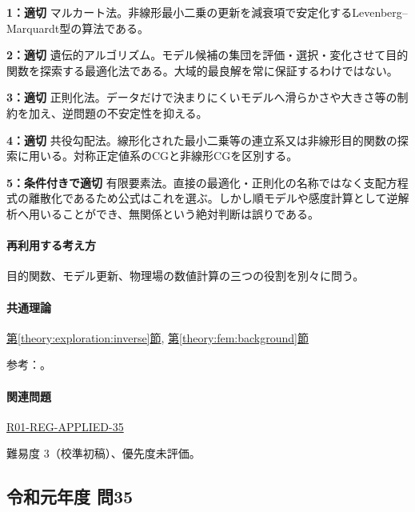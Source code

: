 \noindent\textbf{1：適切} マルカート法。非線形最小二乗の更新を減衰項で安定化するLevenberg–Marquardt型の算法である。\par

\noindent\textbf{2：適切} 遺伝的アルゴリズム。モデル候補の集団を評価・選択・変化させて目的関数を探索する最適化法である。大域的最良解を常に保証するわけではない。\par

\noindent\textbf{3：適切} 正則化法。データだけで決まりにくいモデルへ滑らかさや大きさ等の制約を加え、逆問題の不安定性を抑える。\par

\noindent\textbf{4：適切} 共役勾配法。線形化された最小二乗等の連立系又は非線形目的関数の探索に用いる。対称正定値系のCGと非線形CGを区別する。\par

\noindent\textbf{5：条件付きで適切} 有限要素法。直接の最適化・正則化の名称ではなく支配方程式の離散化であるため公式はこれを選ぶ。しかし順モデルや感度計算として逆解析へ用いることができ、無関係という絶対判断は誤りである。\par

\paragraph{再利用する考え方} 目的関数、モデル更新、物理場の数値計算の三つの役割を別々に問う。

\paragraph{共通理論} \hyperref[theory:exploration:inverse]{第\ref*{theory:exploration:inverse}節}, \hyperref[theory:fem:background]{第\ref*{theory:fem:background}節}

\par 参考：\cite{pygimli_inversion,mit_roy_fea1999}。

\paragraph{関連問題} \hyperref[q:r01-reg-applied-35]{R01-REG-APPLIED-35}

\par 難易度 3（校準初稿）、優先度未評価。

\subsection{令和元年度 問35}
\label{q:r01-reg-applied-35}

